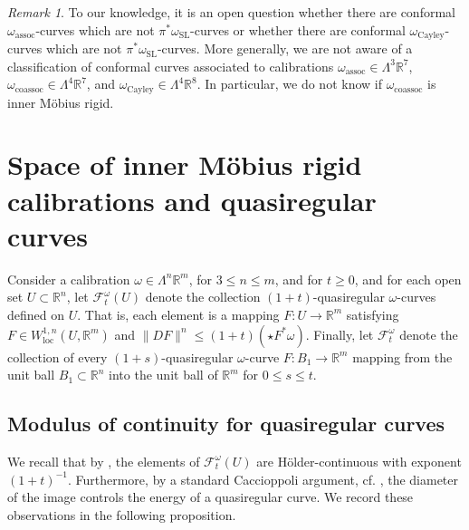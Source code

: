 \documentclass[a4paper,leqno,11pt]{amsart}
\numberwithin{equation}{section}
\theoremstyle{remark}
\newtheorem{remark}[theorem]{Remark}
\theoremstyle{remark}
\newcommand{\R}{\mathbb{R}}
\DeclareMathOperator{\loc}{loc}
\newcommand{\SL}{\mathrm{SL}}
\newcommand{\assoc}{\mathrm{assoc}}
\newcommand{\coassoc}{\mathrm{coassoc}}
\newcommand{\Cayley}{\mathrm{Cayley}}
\begin{document}
\begin{remark}
To our knowledge, it is an open question whether there are conformal $\omega_{\assoc}$-curves which are not $\pi^*\omega_\SL$-curves or whether there are conformal $\omega_\Cayley$-curves which are not $\pi^*\omega_\SL$-curves. More generally, we are not aware of a classification of conformal curves associated to calibrations $\omega_\assoc\in \Lambda^3 \R^7$, $\omega_\coassoc \in \Lambda^4 \R^7$, and $\omega_\Cayley \in \Lambda^4 \R^8$. In particular, we do not know if $\omega_{\coassoc}$ is inner Möbius rigid.
\end{remark}




\section{Space of inner M\"obius rigid calibrations and quasiregular curves}
\label{sec:HPP}

Consider a calibration $\omega \in \Lambda^n \mathbb{R}^m$, for $3 \leq n \leq m$, and for $t \geq 0$, and for each open set $U \subset \mathbb{R}^n$, let $\mathcal{F}^{\omega}_{t}(U)$ denote the collection $(1+t)$-quasiregular $\omega$-curves defined on $U$. That is, each element is a mapping $F \colon U \to \mathbb{R}^m$ satisfying $F \in W^{1,n}_{\loc}( U, \mathbb{R}^m )$ and $\| DF \|^n \leq (1+t) \left(\star F^{*}\omega\right)$. Finally, let $\mathcal{F}^{\omega}_t$ denote the collection of every $(1+s)$-quasiregular $\omega$-curve $F \colon B_1 \to \mathbb{R}^m$ mapping from the unit ball $B_1 \subset \mathbb{R}^n$ into the unit ball of $\mathbb{R}^m$ for $0 \leq s \leq t$.

\subsection{Modulus of continuity for quasiregular curves}
We recall that by \cite[Theorem 6.8]{Iko:23}, the elements of $\mathcal{F}^{\omega}_t(U)$ are Hölder-continuous with exponent $(1+t)^{-1}$. Furthermore, by a standard Caccioppoli argument, cf. \cite[Lemma 6.1]{Onn:Pan:21}, the diameter of the image controls the energy of a quasiregular curve. We record these observations in the following proposition.
\end{document}
